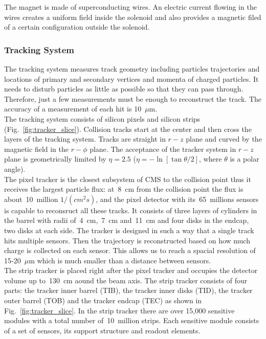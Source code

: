 The magnet is made of superconducting wires. An electric current flowing in the wires creates a uniform field inside the solenoid and also provides a magnetic filed of a certain configuration outside the solenoid.\\

\subsubsection{Tracking System}

The tracking system measures track geometry including particles trajectories and locations of primary and secondary vertices and momenta of charged particles. It needs to disturb particles as little as possible so that they can pass through. Therefore, just a few measurements must be enough to reconstruct the track. The accuracy of a measurement of each hit is 10~$\mu$m.\\

The tracking system consists of silicon pixels and silicon strips (Fig.~\ref{fig:tracker_slice}). Collision tracks start at the center and then cross the layers of the tracking system. Tracks are straight in $r-z$ plane and curved by the magnetic field in the $r-\phi$ plane. The acceptance of the tracker system in $r-z$ plane is geometrically limited by $\eta=2.5$ ($\eta=-\ln[ {\tan{\theta/2}}]$, where $\theta$ is a polar angle).\\

The pixel tracker is the closest subsystem of CMS to the collision point thus it receives the largest particle flux: at~8~cm from the collision point the flux is about~10~million $1/(cm^2 s)$, and the pixel detector with its~65~millions sensors is capable to reconsruct all these tracks. It consists of three layers of cylinders in the barrel with radii of~4~cm,~7~cm and~11~cm and four disks in the endcap, two disks at each side. The tracker is designed in such a way that a single track hits multiple sensors. Then the trajectory is reconstructed based on how much charge is collected on each sensor. This allows us to reach a spacial resolution of 15-20~$\mu$m which is much smaller than a distance between sensors.\\

The strip tracker is placed right after the pixel tracker and occupies the detector volume up to~130~cm aound the beam axis. The strip tracker consists of four parts: the tracker inner barrel (TIB), the tracker inner disks (TID), the tracker outer barrel (TOB) and the tracker endcap (TEC) as shown in Fig.~\ref{fig:tracker_slice}. In the strip tracker there are over 15,000 sensitive modules with a total number of~10~million strips. Each sensitive module consists of a set of sensors, its support structure and readout elements.\\

